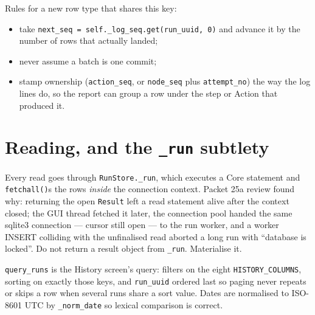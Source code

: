 Rules for a new row type that shares this key:

\begin{itemize}
  \item take \texttt{next\_\allowbreak{}seq = self.\_\allowbreak{}log\_\allowbreak{}seq.get(run\_\allowbreak{}uuid, 0)} and advance it by the number of rows
    that actually landed;
  \item never assume a batch is one commit;
  \item stamp ownership (\texttt{action\_seq}, or \texttt{node\_seq} plus \texttt{attempt\_no}) the way the
    log lines do, so the report can group a row under the step or Action that produced it.
\end{itemize}

\section{Reading, and the \texttt{\_run} subtlety}

Every read goes through \texttt{RunStore.\_run}, which executes a Core statement and
\texttt{fetchall()}s the rows \emph{inside} the connection context. Packet 25a review found why:
returning the open \texttt{Result} left a read statement alive after the context closed; the GUI thread
fetched it later, the connection pool handed the same sqlite3 connection --- cursor still open --- to the
run worker, and a worker INSERT colliding with the unfinalised read aborted a long run with ``database is
locked''. Do not return a result object from \texttt{\_run}. Materialise it.

\texttt{query\_runs} is the History screen's query: filters on the eight \texttt{HISTORY\_COLUMNS},
sorting on exactly those keys, and \texttt{run\_uuid} ordered last so paging never repeats or skips a row
when several runs share a sort value. Dates are normalised to ISO-8601 UTC by \texttt{\_norm\_date} so
lexical comparison is correct.

